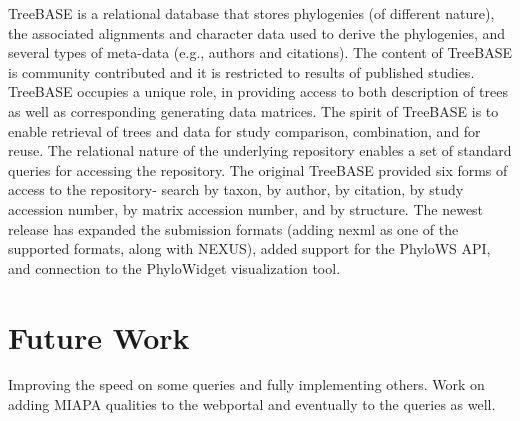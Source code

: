 \documentclass[10pt]{article}
\begin{document}
TreeBASE \cite{treebase} is a relational database that stores phylogenies (of
different nature), the associated alignments and character data used to derive
the phylogenies, and several types of meta-data (e.g., authors and citations).
The content of TreeBASE is community contributed and it is restricted to
results of published studies. TreeBASE occupies a unique role, in providing
access to both description of trees as well as corresponding generating data
matrices.  The spirit of TreeBASE is to enable retrieval of trees and data for
study comparison, combination, and for reuse. The relational nature of the
underlying repository enables a set of standard queries for accessing the
repository. The original TreeBASE provided six forms of access to the
repository- search by taxon, by author, by citation, by study accession number,
by matrix accession number, and by structure.  The newest release has expanded
the submission formats (adding nexml as one of the supported formats, along
with NEXUS), added support for the PhyloWS API, and connection to the
PhyloWidget visualization tool.

\section{Future Work}

Improving the speed on some queries and fully implementing others.  Work on
adding MIAPA qualities to the webportal and eventually to the queries as well.


  
\end{document}
